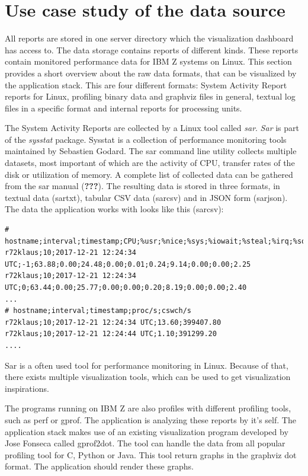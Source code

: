 \documentclass[american,a4paper,oneside,,tablecaptionabove]{scrbook}
\begin{document}
\section{Use case study of the data
source}\label{use-case-study-of-the-data-source}

All reports are stored in one server directory which the visualization
dashboard has access to. The data storage contains reports of different
kinds. These reports contain monitored performance data for IBM Z
systems on Linux. This section provides a short overview about the raw
data formats, that can be visualized by the application stack. This are
four different formats: System Activity Report reports for Linux,
profiling binary data and graphviz files in general, textual log files
in a specific format and internal reports for processing units.

The System Activity Reports are collected by a Linux tool called
\emph{sar}. \emph{Sar} is part of the \emph{sysstat} package. Sysstat is
a collection of performance monitoring tools maintained by Sebastien
Godard. The sar command line utility collects multiple datasets, most
important of which are the activity of CPU, transfer rates of the disk
or utilization of memory. A complete list of collected data can be
gathered from the sar manual ({\textbf{???}}). The resulting data is
stored in three formats, in textual data (sartxt), tabular CSV data
(sarcsv) and in JSON form (sarjson). The data the application works with
looks like this (sarcsv):

\begin{lstlisting}[caption={Sysstat report - sarcsv file}]
# hostname;interval;timestamp;CPU;%usr;%nice;%sys;%iowait;%steal;%irq;%soft;%guest;%gnice;%idle
r72klaus;10;2017-12-21 12:24:34 UTC;-1;63.88;0.00;24.48;0.00;0.01;0.24;9.14;0.00;0.00;2.25
r72klaus;10;2017-12-21 12:24:34 UTC;0;63.44;0.00;25.77;0.00;0.00;0.20;8.19;0.00;0.00;2.40
...
# hostname;interval;timestamp;proc/s;cswch/s
r72klaus;10;2017-12-21 12:24:34 UTC;13.60;399407.80
r72klaus;10;2017-12-21 12:24:44 UTC;1.10;391299.20
....
\end{lstlisting}

Sar is a often used tool for performance monitoring in Linux. Because of
that, there exists multiple visualization tools, which can be used to
get visualization inspirations.

The programs running on IBM Z are also profiles with different profiling
tools, such as perf or gprof. The application is analyzing these reports
by it's self. The application stack makes use of an existing
visualization program developed by Jose Fonseca called gprof2dot. The
tool can handle the data from all popular profiling tool for C, Python
or Java. This tool return graphs in the graphviz dot format. The
application should render these graphs.
\end{document}
